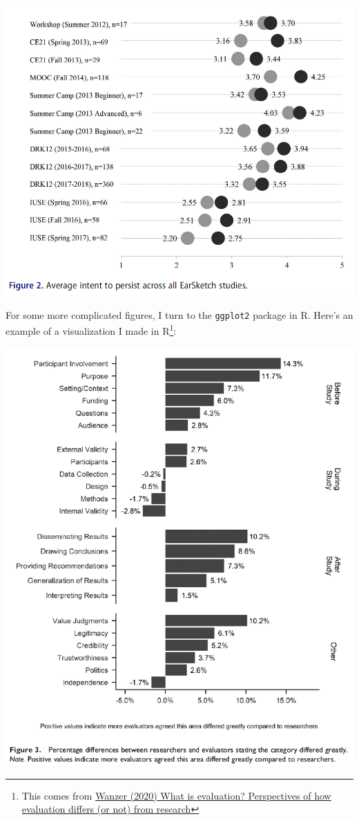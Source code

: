 \documentclass[
]{book}
\begin{document}
\includegraphics{images/02-stats-foundations/example3.png}

For some more complicated figures, I turn to the \texttt{ggplot2} package in R. Here's an example of a visualization I made in R\footnote{This comes from \href{https://journals.sagepub.com/doi/10.1177/1098214020920710}{Wanzer (2020) What is evaluation? Perspectives of how evaluation differs (or not) from research}}:

\includegraphics{images/02-stats-foundations/example4.png}
\end{document}

